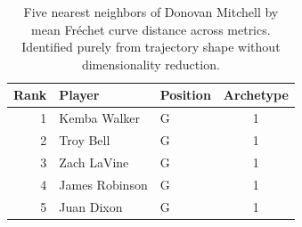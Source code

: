 \begin{table}[htbp]
  \centering\small
  \begin{tabular}{rllc}
    \toprule
    Rank & Player & Position & Archetype \\
    \midrule
    1 & Kemba Walker & G & 1 \\
    2 & Troy Bell & G & 1 \\
    3 & Zach LaVine & G & 1 \\
    4 & James Robinson & G & 1 \\
    5 & Juan Dixon & G & 1 \\
    \bottomrule
  \end{tabular}
  \caption{Five nearest neighbors of Donovan Mitchell by mean Fr\'{e}chet curve distance across metrics. Identified purely from trajectory shape without dimensionality reduction.}
  \label{tab:Donovan_Mitchell_frechet_curve_neighbors}
\end{table}

